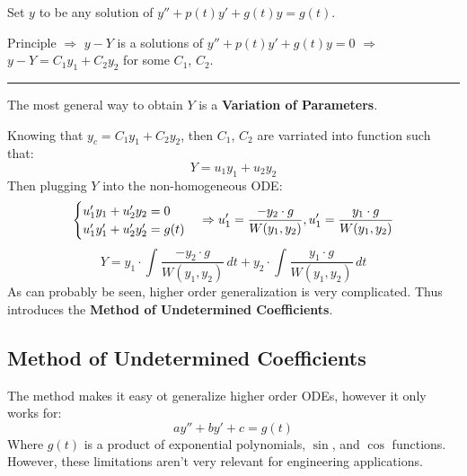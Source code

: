 \documentclass[12pt]{article}
\begin{document}
Set $y$ to be any solution of $y'' + p(t)y' + g(t)y = g(t)$.

Principle $\Rightarrow$ $y-Y$ is a solutions of $y'' + p(t)y' + g(t)y = 0$ $\Rightarrow$ $y-Y = C_1y_1 + C_2y_2$ for some $C_1$, $C_2$.

\vspace{12pt}
\hrule
\vspace{12pt}

The most general way to obtain $Y$ is a \textbf{Variation of Parameters}.

Knowing that $y_c = C_1y_1 + C_2y_2$, then $C_1$, $C_2$ are varriated into function such that:
\begin{equation*}
  Y = u_1y_1 + u_2y_2
\end{equation*}
Then plugging $Y$ into the non-homogeneous ODE:
\[
  \begin{cases} 
    u_1'y_1 + u_2'y_2 = 0 \\
    u_1'y_1' + u_2'y_2' = g(t)
  \end{cases}
  \Rightarrow u_1' = \frac{-y_2 \cdot g}{W(y_1,y_2)}, u_1' = \frac{y_1 \cdot g}{W(y_1,y_2)} \\
\]
\begin{equation*}
  Y = y_1 \cdot \int_{}^{} \frac{-y_2 \cdot g}{W(y_1,y_2)} \,dt + y_2 \cdot \int_{}^{} \frac{y_1 \cdot g}{W(y_1,y_2)} \,dt
\end{equation*}
As can probably be seen, higher order generalization is very complicated. Thus introduces the \textbf{Method of Undetermined Coefficients}.
\subsection{Method of Undetermined Coefficients}
\label{ssec:methodOfUndeterminedCoefficients}
The method makes it easy ot generalize higher order ODEs, however it only works for:
\begin{equation*}
  ay'' + by' + c = g(t)
\end{equation*}
Where $g(t)$ is a product of exponential polynomials, $\sin$, and $\cos$ functions. However, these limitations aren't very relevant for engineering applications.
\end{document}
